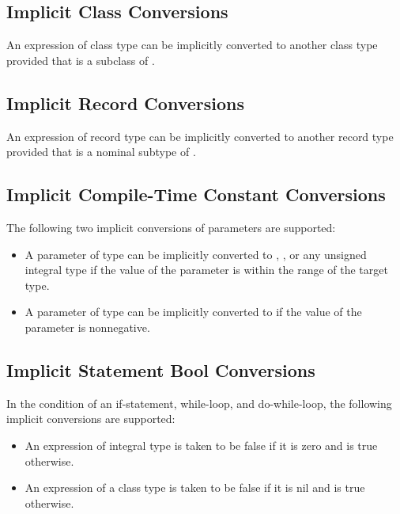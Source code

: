 \subsection{Implicit Class Conversions}
\label{Implicit_Class_Conversions}

An expression of class type  can be implicitly converted to
another class type  provided that  is a subclass
of .

\subsection{Implicit Record Conversions}
\label{Implicit_Record_Conversions}

An expression of record type  can be implicitly converted to
another record type  provided that  is a nominal
subtype of .

\subsection{Implicit Compile-Time Constant Conversions}
\label{Implicit_Compile_Time_Constant_Conversions}

The following two implicit conversions of parameters are supported:
\begin{itemize}
\item A parameter of type  can be implicitly converted
to , , or any unsigned integral type if the
value of the parameter is within the range of the target type.
\item A parameter of type  can be implicitly converted
to  if the value of the parameter is nonnegative.
\end{itemize}

\subsection{Implicit Statement Bool Conversions}
\label{Implicit_Statement_Bool_Conversions}

In the condition of an if-statement, while-loop, and do-while-loop,
the following implicit conversions are supported:
\begin{itemize}
\item An expression of integral type is taken to be false if it is zero and is true otherwise.
\item An expression of a class type is taken to be false if it is nil and is true otherwise.
\end{itemize}

